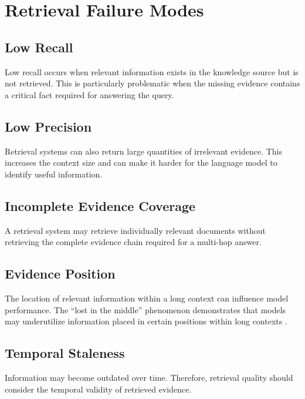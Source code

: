 \documentclass[12pt,a4paper]{article}
\begin{document}
\section{Retrieval Failure Modes}
\label{sec:failure-modes}

\subsection{Low Recall}

Low recall occurs when relevant information exists in the knowledge source
but is not retrieved. This is particularly problematic when the missing
evidence contains a critical fact required for answering the query.

\subsection{Low Precision}

Retrieval systems can also return large quantities of irrelevant evidence.
This increases the context size and can make it harder for the language
model to identify useful information.

\subsection{Incomplete Evidence Coverage}

A retrieval system may retrieve individually relevant documents without
retrieving the complete evidence chain required for a multi-hop answer.

\subsection{Evidence Position}

The location of relevant information within a long context can influence
model performance. The ``lost in the middle'' phenomenon demonstrates that
models may underutilize information placed in certain positions within
long contexts \cite{liu2024lostmiddle}.

\subsection{Temporal Staleness}

Information may become outdated over time. Therefore, retrieval quality
should consider the temporal validity of retrieved evidence.
\end{document}
